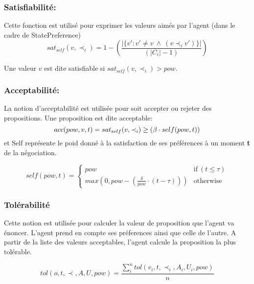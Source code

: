 \documentclass{llncs}
\begin{document}
	\subsubsection{Satisfiabilit\'e:}
	
	Cette fonction est utilis\'e pour exprimer les valeurs aim\'es par l'agent (dans le cadre de StatePreference)
	\begin{equation}
	sat_{self}(v, \prec_i) =	1 - \left( \frac{|\{v' : v' \neq v \  \wedge \ (v \prec_i v')\}| }{( |C_i| - 1 )}\right)
	\end{equation}
	
	Une valeur $v$ est dite satisfiable si $ sat_{self}(v, \prec_i) > pow$.
	
	\subsubsection{Acceptabilit\'e:}
	La notion d'acceptabilit\'e est utilis\'ee pour soit accepter ou rejeter des propositions. Une proposition est dite acceptable: 
	\begin{equation}
	\vspace{-.5em} 
	acc(pow,v, t) = sat_{self}(v, \prec_i) \geq  (\beta \cdot self(pow,t))
	\end{equation}
	et Self repr\'esente le poid donn\'e \`a la satisfaction de ses pr\'ef\'erences \`a un moment \textbf{t} de la n\'egociation. 
	
	\begin{equation}
	self(pow, t) = \left\{\begin{array}{ll}
	pow & \mathrm{if\ } (t \leq \tau)\\
	max(0, pow - (\frac{\delta}{pow} \cdot (t - \tau))) & \mathrm{otherwise}
	\end{array}\right.
	\end{equation}
	
	\subsubsection{Tol\'erabilit\'e}
	Cette notion est utilis\'ee pour calculer la valeur de proposition que l'agent va \'enoncer. L'agent prend en compte ses pr\'eferences ainsi que celle de l'autre. A partir de la liste des valeurs acceptables, l'agent calcule la proposition la plus tol\'erable. 
	
	\begin{equation}
	tol(o, t, \prec, A, U, pow) = \frac{ \sum_{i}^{n} tol(v_i, t, \prec_i, A_i, U_i, pow) } {n}
	\end{equation}
	
\end{document}
